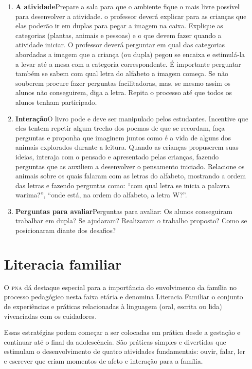 \documentclass[11pt]{extarticle}
\begin{document}
\begin{enumerate}
\item \textbf{A atividade}\quad Prepare a sala para que o ambiente fique o mais livre possível para desenvolver a atividade. o professor deverá explicar para as crianças que elas poderão ir em duplas para pegar a imagem na caixa. Explique as categorias (plantas, animais e pessoas) e o que devem fazer quando a atividade iniciar. O professor deverá perguntar em qual das categorias abordadas a imagem que a criança (ou dupla) pegou se encaixa e estimulá-la a levar até a mesa com a categoria correspondente. É importante perguntar também se sabem com qual letra do alfabeto a imagem começa. Se não souberem procure fazer perguntas facilitadoras, mas, se mesmo assim os alunos não conseguirem, diga a letra. Repita o processo até que todos os alunos tenham participado.


\item \textbf{Interação}\quad O livro pode e deve ser 
manipulado pelos estudantes. Incentive que eles tentem repetir algum trecho dos poemas de que se recordam,
faça perguntas e proponha que imaginem juntos como é a vida 
de alguns dos animais explorados durante a leitura. Quando as crianças propuserem suas ideias, interaja com o pensado e apresentado pelas crianças, fazendo perguntas que as auxiliem a desenvolver o pensamento iniciado.
Relacione os animais sobre os quais falaram com as letras do alfabeto, mostrando a ordem das letras e fazendo perguntas como: ``com qual letra se inicia a palavra warima?'', ``onde está, na ordem do alfabeto, a letra W?''.

\item \textbf{Perguntas para avaliar}\quad Perguntas para avaliar: Os alunos conseguiram trabalhar em dupla? Se ajudaram? Realizaram o trabalho proposto? Como se posicionaram diante dos desafios? 
\end{enumerate}


\section{Literacia familiar}
O \textsc{pna} dá destaque especial para a importância do envolvimento da família 
no processo pedagógico nesta faixa etária e denomina Literacia Familiar o conjunto 
de experiências e práticas relacionadas à linguagem (oral, escrita ou lida) vivenciadas 
com os cuidadores. 

Essas estratégias podem começar a ser colocadas em prática desde a 
gestação e continuar até o final da adolescência. São práticas simples e divertidas 
que estimulam o desenvolvimento de quatro atividades fundamentais: ouvir, falar, 
ler e escrever que criam momentos de afeto e interação para a família. 
\end{document}
